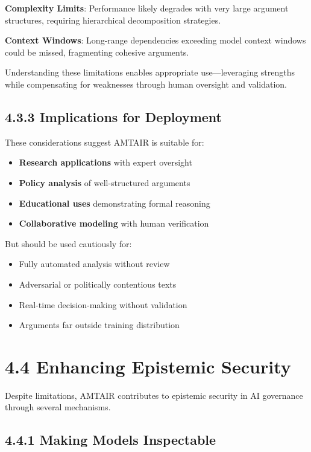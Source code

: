 \documentclass[
  11pt,
  letterpaper,
  openany]{book}
\providecommand{\tightlist}{%
  \setlength{\itemsep}{0pt}\setlength{\parskip}{0pt}}
\begin{document}
\textbf{Complexity Limits}: Performance likely degrades with very large
argument structures, requiring hierarchical decomposition strategies.

\textbf{Context Windows}: Long-range dependencies exceeding model
context windows could be missed, fragmenting cohesive arguments.

Understanding these limitations enables appropriate use---leveraging
strengths while compensating for weaknesses through human oversight and
validation.

\subsection{4.3.3 Implications for
Deployment}\label{sec-deployment-implications}

These considerations suggest AMTAIR is suitable for:

\begin{itemize}
\tightlist
\item
  \textbf{Research applications} with expert oversight
\item
  \textbf{Policy analysis} of well-structured arguments
\item
  \textbf{Educational uses} demonstrating formal reasoning
\item
  \textbf{Collaborative modeling} with human verification
\end{itemize}

But should be used cautiously for:

\begin{itemize}
\tightlist
\item
  Fully automated analysis without review
\item
  Adversarial or politically contentious texts
\item
  Real-time decision-making without validation
\item
  Arguments far outside training distribution
\end{itemize}

\section{4.4 Enhancing Epistemic Security}\label{sec-epistemic-security}

Despite limitations, AMTAIR contributes to epistemic security in AI
governance through several mechanisms.

\subsection{4.4.1 Making Models
Inspectable}\label{sec-inspectable-models}
\end{document}
